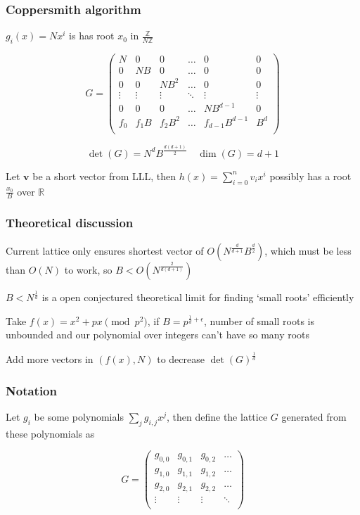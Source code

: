 \documentclass{beamer}
\begin{document}
\begin{frame}
    \frametitle{Coppersmith algorithm}
    $g_i(x)=Nx^i$ is has root $x_0$ in $\frac{\mathbb Z}{N\mathbb Z}$\break 

    $$G=\begin{pmatrix}
        N&0&0&\dots&0&0\\
        0&NB&0&\dots&0&0\\
        0&0&NB^2&\dots&0&0\\
        \vdots&\vdots&\vdots&\ddots&\vdots&\vdots\\
        0&0&0&\dots&NB^{d-1}&0\\
        f_0&f_1B&f_2B^2&\dots&f_{d-1}B^{d-1}&B^d\\
    \end{pmatrix}$$

    $$\det(G)=N^dB^{\frac{d(d+1)}2}\quad\dim(G)=d+1$$

    Let $\mathbf v$ be a short vector from LLL, then $h(x)=\sum_{i=0}^nv_ix^i$ possibly has a root $\frac{x_0}B$ over $\mathbb R$
\end{frame}

\begin{frame}
    \frametitle{Theoretical discussion}
    Current lattice only ensures shortest vector of $O\left(N^{\frac d{d+1}}B^{\frac d2}\right)$, which must be less than $O(N)$ to work, so $B<O\left(N^{\frac2{d(d+1)}}\right)$\break

    $B<N^{\frac1d}$ is a open conjectured theoretical limit for finding `small roots' efficiently

    Take $f(x)=x^2+px\pmod p^2$, if $B=p^{\frac 1d+\epsilon}$, number of small roots is unbounded and our polynomial over integers can't have so many roots\break
    
    Add more vectors in $(f(x),N)$ to decrease $\det(G)^{\frac1d}$
\end{frame}

\begin{frame}
    \frametitle{Notation}
    Let $g_i$ be some polynomials $\sum_jg_{i,j}x^j$, then define the lattice $G$ generated from these polynomials as
    
    $$G=\begin{pmatrix}
        g_{0,0}&g_{0,1}&g_{0,2}&\dots\\
        g_{1,0}&g_{1,1}&g_{1,2}&\dots\\
        g_{2,0}&g_{2,1}&g_{2,2}&\dots\\
        \vdots&\vdots&\vdots&\ddots\\
    \end{pmatrix}$$
\end{frame}
\end{document}
